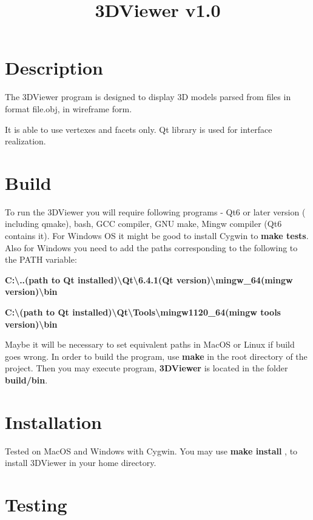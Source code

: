 \documentclass[12pt, a4paper]{article}
\title{3DViewer v1.0}
\date{}
\begin{document}
\maketitle
\tableofcontents

\pagebreak

\section*{Description}

The 3DViewer program is designed to display 3D models parsed from files in format file.obj, in wireframe form.

It is able to use vertexes and facets only. Qt library is used for interface realization.

\section{Build}

To run the 3DViewer you will require following programs - Qt6 or later version ( including qmake), bash, GCC compiler,
GNU make, Mingw compiler (Qt6 contains it). For Windows OS it might be good to install Cygwin to \textbf{make tests}. Also for Windows you need to add the paths
corresponding to the following to the PATH variable:

\noindent\textbf{C:\textbackslash{}..(path to Qt installed)\textbackslash{}Qt\textbackslash{}6.4.1(Qt version)\textbackslash{}mingw\_64(mingw version)\textbackslash{}bin}

\noindent\textbf{C:\textbackslash{}(path to Qt installed)\textbackslash{}Qt\textbackslash{}Tools\textbackslash{}mingw1120\_64(mingw tools version)\textbackslash{}bin}

Maybe it will be necessary to set equivalent paths in MacOS or Linux if build goes wrong.
 In order to build the program, use \textbf{make} in the root directory of the project.  Then you may execute program,
\textbf{3DViewer} is located in the folder \textbf{build/bin}.

\section{Installation }

Tested on MacOS  and Windows with Cygwin.
You may use \textbf{make install} , to install 3DViewer in your home directory.

\section{Testing}
\end{document}
